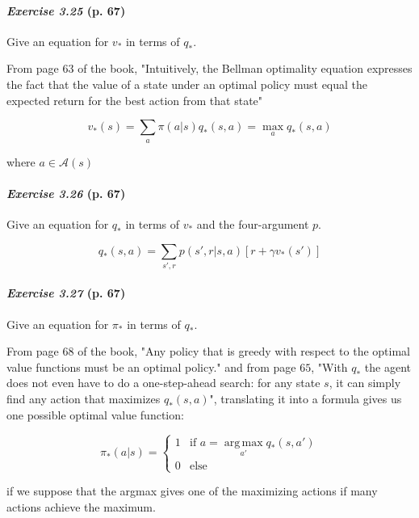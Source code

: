 \documentclass[10pt,a4paper]{article}
\DeclareMathOperator*{\argmax}{arg\,max}
\begin{document}
\clearpage
\paragraph{\textit{Exercise 3.25} (p. 67)} Give an equation for $v_*$ in terms of $q_*$.

\bigskip
From page $63$ of the book, "Intuitively, the Bellman optimality equation expresses the
fact that the value of a state under an optimal policy must equal the expected return for
the best action from that state"

\begin{equation}
v_*(s) = \sum_{a} \pi(a \lvert s) q_*(s, a) = \max_{a} q_*(s, a)
\end{equation}

where $a \in \mathcal{A}(s)$

\paragraph{\textit{Exercise 3.26} (p. 67)} Give an equation for $q_*$ in terms of $v_*$ and the four-argument $p$.

\bigskip
\begin{equation}
q_*(s, a) = \sum_{s', r} p(s', r \lvert s, a) \left[r + \gamma v_*(s')\right]
\end{equation}

\paragraph{\textit{Exercise 3.27} (p. 67)} Give an equation for $\pi_*$ in terms of $q_*$.

\bigskip

From page $68$ of the book, "Any policy that is greedy with respect to the optimal value functions must be an optimal
policy." and from page $65$, "With $q_*$ the agent does not
even have to do a one-step-ahead search: for any state $s$, it can simply find any action
that maximizes $q_*(s, a)$", translating it into a formula gives us one possible optimal value function:

\begin{equation}
\pi_*(a \lvert s) = \begin{cases} 1 & \textrm{if } a = \argmax\limits_{a'} q_*(s, a')\\ 0 & \textrm{else}\end{cases}
\end{equation}

if we suppose that the argmax gives one of the maximizing actions if many actions achieve the maximum.
\end{document}
